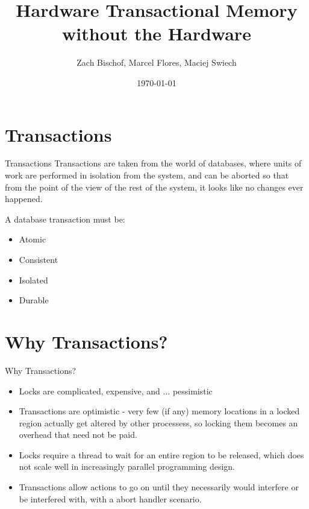 \documentclass{beamer}
\begin{document}
\title{Hardware Transactional Memory without the Hardware}
\author{Zach Bischof, Marcel Flores, Maciej Swiech}
\date{\today}

\begin{frame}[plain]
  \titlepage
\end{frame}

\section{Transactions}

\begin{frame}{Transactions}
  Transactions are taken from the world of databases, where units of work are
  performed in isolation from the system, and can be aborted so that from the
  point of the view of the rest of the system, it looks like no changes ever
  happened.

  A database transaction must be:
  \begin{itemize}
    \item Atomic
    \item Consistent
    \item Isolated
    \item Durable
  \end{itemize}
\end{frame}

\section{Why Transactions?}
\begin{frame}{Why Transactions?}
  \begin{itemize}
    \item Locks are complicated, expensive, and ... \pause pessimistic
    \pause
    \item Transactions are optimistic - very few (if any) memory locations in a locked 
    region actually get altered by other processess, so locking them becomes
    an overhead that need not be paid.
    \pause
    \item Locks require a thread to wait for an entire region to be released, which
    does not scale well in increasingly parallel programming design.
    \pause
    \item Transactions allow actions to go on until they necessarily would interfere
    or be interfered with, with a abort handler scenario.
  \end{itemize}

\end{frame}
  
\end{document}
